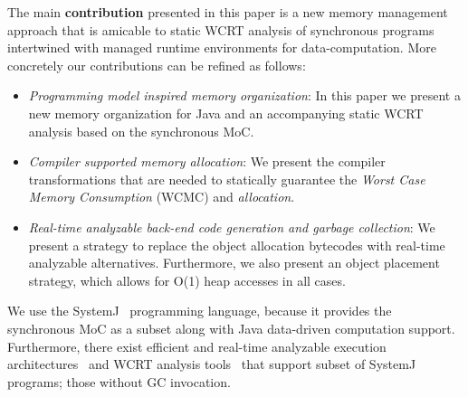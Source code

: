 
The main \textbf{contribution} presented in this paper is a new memory
management approach that is amicable to static WCRT analysis of
synchronous programs intertwined with managed runtime environments for
data-computation. More concretely our contributions can be refined as
follows:

\begin{itemize}
\item \textit{Programming model inspired memory organization}: In this
  paper we present a new memory organization for Java and an
  accompanying static WCRT analysis based on the synchronous MoC.
\item \textit{Compiler supported memory allocation}: We present the
  compiler transformations that are needed to statically guarantee the
  \textit{Worst Case Memory Consumption} (WCMC) and \textit{allocation}.
\item \textit{Real-time analyzable back-end code generation and garbage
    collection}: We present a strategy to replace the object allocation
  bytecodes with real-time analyzable alternatives. Furthermore, we also
  present an object placement strategy, which allows for O(1) heap
  accesses in all cases.
\end{itemize}

We use the SystemJ~\cite{amal10} programming language, because it
provides the synchronous MoC as a subset along with Java data-driven
computation support. Furthermore, there exist efficient and real-time
analyzable execution architectures~\cite{nadeem2011rjop} and WCRT
analysis tools~\cite{LiMS14} that support subset of SystemJ programs;
those without GC invocation.


